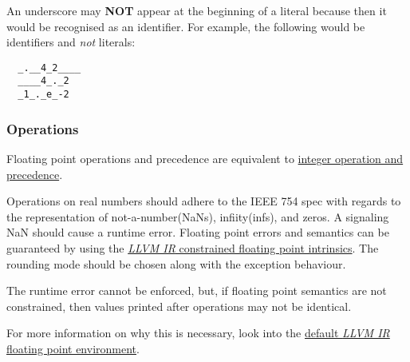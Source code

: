 \documentclass[types.tex]{subfiles}
\begin{document}
An underscore may \textbf{NOT} appear at the beginning of a  literal because then it
would be recognised as an identifier. For example, the following would be identifiers and
\textit{not}  literals:
\begin{lstlisting}
  _.__4_2____
  ____4_._2
  _1_._e_-2
\end{lstlisting}

\subsubsection{Operations}
\label{sssec:real_ops}
Floating point operations and precedence are equivalent to \hyperref[sssec:integer_ops]{integer
operation and precedence}.

Operations on real numbers should adhere to the \textsf{IEEE 754} spec with regards to the
representation of not-a-number(NaNs), infiity(infs), and zeros. A signaling NaN should cause a
runtime error. Floating point errors and semantics can be guaranteed by using the
\href{https://llvm.org/docs/LangRef.html\#constrained-floating-point-intrinsics}{\textit{LLVM IR}
constrained floating point intrinsics}. The  rounding  mode should be chosen
along with the  exception behaviour.

The runtime error cannot be enforced, but, if floating point semantics are not constrained, then
 values printed after operations may not be identical.

For more information on why this is necessary, look into the
\href{https://llvm.org/docs/LangRef.html\#floatenv}{default \textit{LLVM IR} floating point
environment}.
\end{document}
